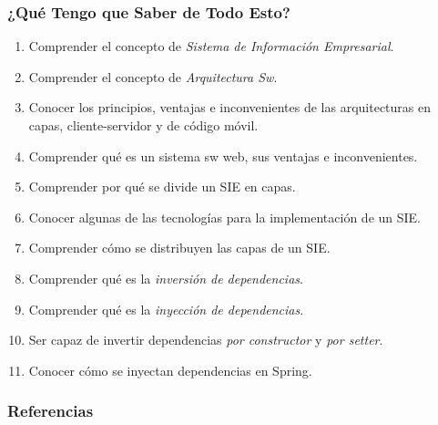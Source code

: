 \documentclass[a4paper,t,xcolor=pst,dvips,colortheme]{beamer}
\begin{document}
\begin{frame}[c]
    \frametitle{¿Qué Tengo que Saber de Todo Esto?}
    \begin{enumerate}[<+->]
        \item Comprender el concepto de \emph{Sistema de Información Empresarial}.
        \item Comprender el concepto de \emph{Arquitectura Sw}.
        \item Conocer los principios, ventajas e inconvenientes de las arquitecturas en capas, cliente-servidor y de código móvil.
        \item Comprender qué es un sistema sw web, sus ventajas e inconvenientes.
        \item Comprender por qué se divide un SIE en capas.
        \item Conocer algunas de las tecnologías para la implementación de un SIE.
        \item Comprender cómo se distribuyen las capas de un SIE.
        \item Comprender qué es la \emph{inversión de dependencias}.
        \item Comprender qué es la \emph{inyección de dependencias}.
        \item Ser capaz de invertir dependencias \emph{por constructor} y \emph{por setter}.
        \item Conocer cómo se inyectan dependencias en Spring.
    \end{enumerate}
\end{frame}

\begin{frame}
	\frametitle{Referencias}
    \nocite{}
	
    
\end{frame}
\end{document}
